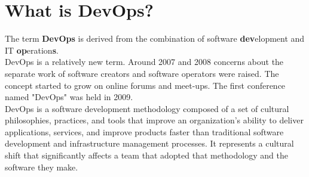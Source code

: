 \section{What is DevOps?} The term \textbf{DevOps} is derived from the combination of software \textbf{dev}elopment and IT \textbf{op}eration\textbf{s}.\\
DevOps is a relatively new term. Around 2007 and 2008 concerns about the separate work of software creators and software operators were raised. The concept started to grow on online forums and meet-ups. The first conference named "DevOps" was held in 2009.\cite{devops-wiki}\\
DevOps is a software development methodology composed of a set of cultural philosophies, practices, and tools that improve an organization's ability to deliver applications, services, and improve products faster than traditional software development and infrastructure management processes. It represents a cultural shift that significantly affects a team that adopted that methodology and the software they make.\cite{devops-atl}


